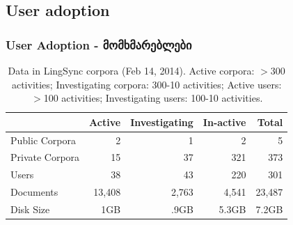 \documentclass{beamer}
\begin{document}


\subsection{User adoption}

\begin{frame}

\frametitle{User Adoption - მომხმარებლები}
\begin{table}[h]
\begin{center}
\scriptsize
\begin{tabular}{lrrrr}
      \toprule
                     ~ &  Active & Investigating & In-active & Total\\
      \midrule
      Public Corpora  &       2 &   1 &   2 & 5 \\
      Private Corpora &      15 &  37 & 321 & 373\\
      Users           &      38 &  43 & 220 & 301 \\
      Documents & 13,408 & 2,763 & 4,541 &23,487\\
      Disk Size & 1GB & .9GB & 5.3GB& 7.2GB\\

      \bottomrule

\end{tabular}
\caption{Data in LingSync corpora (Feb 14, 2014). Active corpora: $>$300
activities; Investigating corpora: 300-10 activities; Active users: $>$100
activities; Investigating users: 100-10 activities.}
\label{lingsync-data}
 \end{center}
 \normalsize
\end{table}

\end{frame}
\end{document}
